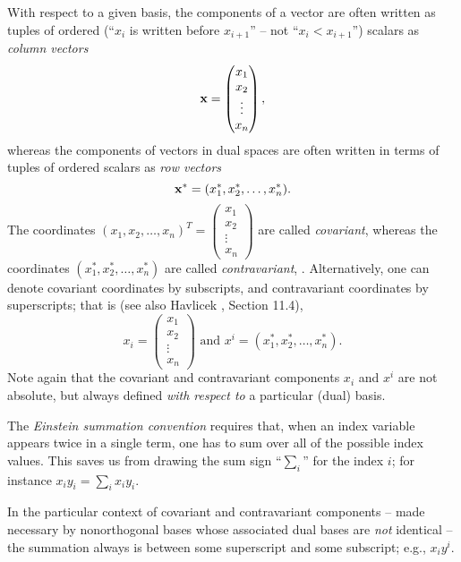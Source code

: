 With respect to a given basis,
the components of a vector are often written as tuples of ordered
(``$x_i$ is written before $x_{i+1}$'' -- not ``$x_i < x_{i+1}$'')
scalars  as {\em column vectors}
\begin{equation}
{\bf x}=
\begin{pmatrix}
x_1\\x_2\\
\vdots \\
x_n
\end{pmatrix}
,
\end{equation}
whereas the components of vectors in dual spaces are often written in terms of
 tuples of ordered
scalars  as {\em row vectors}
\begin{equation}
{\bf x}^*= (x_1^*,x_2^*,\ldots , x_n^*)
.
\end{equation}
The coordinates  $(x_1,x_2,\ldots , x_n)^T
=
\begin{pmatrix}
x_1\\
x_2\\
\vdots \\
x_n
\end{pmatrix}
$
are called
{\em covariant},
whereas the coordinates  $(x_1^*,x_2^*,\ldots , x_n^*)$
are called
{\em contravariant},
.
Alternatively, one can denote
covariant coordinates by subscripts,
and contravariant coordinates by superscripts; that is
(see also
Havlicek \cite{havlicek-laftm}, Section 11.4),
\begin{equation}
x_i =
\begin{pmatrix}
x_1\\
x_2\\
\vdots \\
x_n
\end{pmatrix}
\textrm{ and }
 x^i =
(x_1^*,x_2^*,\ldots , x_n^* ).
\end{equation}
Note again that the covariant and contravariant components
$x_i$ and $x^i$ are not absolute, but always defined {\em with respect to}
a particular (dual) basis.

The {\em Einstein summation convention}
requires that, when an index variable appears twice in a single term, one has to
sum over all of the possible index values.
This saves us from drawing the sum sign ``$\sum_i$'' for the index $i$;
for instance $x_iy_i =\sum_{i}x_iy_i$.

In the particular context of covariant and contravariant components
--
made necessary by nonorthogonal bases whose associated dual bases are {\em not} identical
--
the summation always is between some superscript and some subscript;
e.g., $x_iy^i$.

